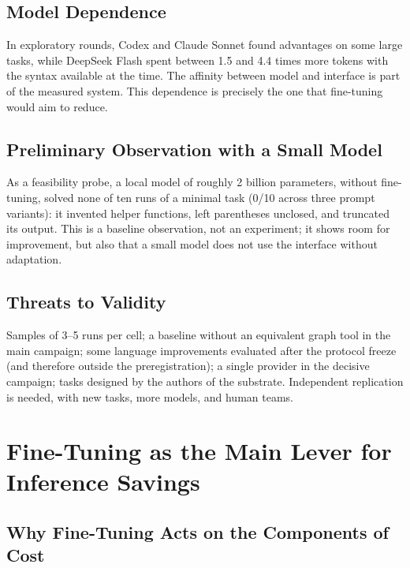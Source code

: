 \documentclass[11pt, a4paper]{article}
\begin{document}
\subsection{Model Dependence}

In exploratory rounds, Codex and Claude Sonnet found advantages on some large tasks, while DeepSeek Flash spent between 1.5 and 4.4 times more tokens with the syntax available at the time. The affinity between model and interface is part of the measured system. This dependence is precisely the one that fine-tuning would aim to reduce.

\subsection{Preliminary Observation with a Small Model}

As a feasibility probe, a local model of roughly 2 billion parameters, without fine-tuning, solved none of ten runs of a minimal task (0/10 across three prompt variants): it invented helper functions, left parentheses unclosed, and truncated its output. This is a baseline observation, not an experiment; it shows room for improvement, but also that a small model does not use the interface without adaptation.

\subsection{Threats to Validity}

Samples of 3--5 runs per cell; a baseline without an equivalent graph tool in the main campaign; some language improvements evaluated after the protocol freeze (and therefore outside the preregistration); a single provider in the decisive campaign; tasks designed by the authors of the substrate. Independent replication is needed, with new tasks, more models, and human teams.

\section{Fine-Tuning as the Main Lever for Inference Savings}
\label{sec:finetune}

\subsection{Why Fine-Tuning Acts on the Components of Cost}
\end{document}

